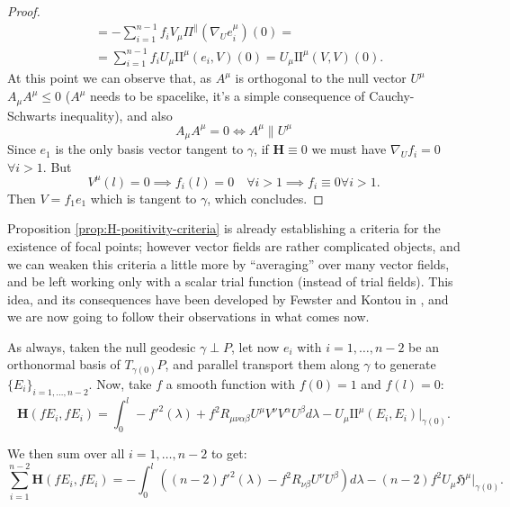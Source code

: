\begin{proof}
\begin{align*}
		& = - \sum_{i = 1}^{n - 1}f_i V_{\mu}\Pi^{\parallel}\left(\nabla_Ue_i^{\mu}\right)(0) =\\
		& = \sum_{i = 1}^{n - 1}f_i U_{\mu}\mathrm{I\!I}^{\mu}(e_i, V)(0) = U_{\mu}\mathrm{I\!I}^{\mu}(V, V)(0).
	\end{align*}
	At this point we can observe that, as \(A^{\mu}\) is orthogonal to the null vector \(U^{\mu}\) \(A_{\mu}A^{\mu} \le 0\) (\(A^{\mu}\) needs to be spacelike, it's a simple consequence of Cauchy-Schwarts inequality), and also
	\[
	A_{\mu}A^{\mu} = 0 \iff A^{\mu}\parallel U^{\mu}
	\]
	Since \(e_1\) is the only basis vector tangent to \(\gamma\), if \(\textbf{H} \equiv 0\) we must have \(\nabla_Uf_i = 0\) \(\forall i > 1\). But
	\[
	V^{\mu}(l) = 0 \implies f_i(l) = 0 \quad \forall i > 1 \implies f_i\equiv 0 \forall i > 1.
	\]
	Then \(V = f_1e_1\) which is tangent to \(\gamma\), which concludes.
\end{proof}

Proposition \ref{prop:H-positivity-criteria} is already establishing a criteria for the existence of focal points; however vector fields are rather complicated objects, and we can weaken this criteria a little more by ``averaging'' over many vector fields, and be left working only with a scalar trial function (instead of trial fields). This idea, and its consequences have been developed by Fewster and Kontou in \cite{fewster2020new}, and we are now going to follow their observations in what comes now.

As always, taken the null geodesic \(\gamma\perp P\), let now \(e_i\) with \(i = 1, \ldots, n - 2\) be an orthonormal basis of \(T_{\gamma(0)}P\), and parallel transport them along \(\gamma\) to generate \(\{E_i\}_{i = 1, \ldots, n-2}\). Now, take \(f\) a smooth function with \(f(0) = 1\) and \(f(l) = 0\):
\begin{equation*}
	\textbf{H}(fE_i, fE_i) = \int_{0}^{l} -f'^2(\lambda) + f^2R_{\mu\nu\alpha\beta}U^{\mu}V^{\nu}V^{\alpha}U^{\beta} d\lambda- U_{\mu}\mathrm{I\!I}^{\mu}(E_i, E_i)\Big\vert_{\gamma(0)}.
\end{equation*}

We then sum over all \(i = 1, \ldots, n - 2\) to get:
\begin{equation}
	\label{eq:hessian-averagded}
	\sum_{i=1}^{n - 2}\textbf{H}(fE_i, fE_i) = - \int_{0}^{l} \left((n - 2)f'^2(\lambda) - f^2R_{\nu\beta}U^{\nu}U^{\beta}\right) d\lambda - (n - 2)f^2U_{\mu}\mathfrak{H}^{\mu}\Big\vert_{\gamma(0)}.
\end{equation}

